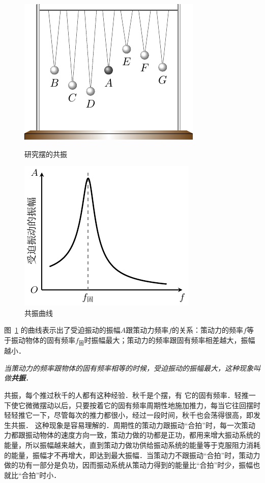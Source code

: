 \begin{figure}[htbp]
    \centering
    \begin{minipage}[b]{0.45\textwidth}
        \centering
        \includegraphics{fig/A/9-13.pdf}
        \caption{研究摆的共振}\label{fig_A_9-13}
    \end{minipage}
    \hfil
    \begin{minipage}[b]{0.45\textwidth}
        \centering
        \includegraphics{fig/A/9-14.pdf}
        \caption{共振曲线}\label{fig_A_9-14}
    \end{minipage}
\end{figure}


图~\ref{fig_A_9-14} 的曲线表示出了受迫振动的振幅$A$跟策动力频率$f$的关系：策动力的频率$f$等于振动物体的固有频率$f_{\text{固}}$时振幅最大；策动力的频率跟固有频率相差越大，振幅越小．

\textit{当策动力的频率跟物体的固有频率相等的时候，受迫振动的振幅最大，这种现象叫做\textbf{共振}．}

共振，每个推过秋千的人都有这种经验．秋千是个摆，有
它的固有频率．轻推一下使它微微摆动以后，只要按着它的固有频率周期性地施加推力，每当它往回摆时轻轻推它一下，尽管每次的推力都很小，经过一段时间，秋千也会荡得很高，即发生共振．
这种现象是容易理解的．周期性的策动力跟振动“合拍”时，每一次策动力都跟振动物体的速度方向一致，策动力做的功都是正功，都用来增大振动系统的能量，所以振幅越来越大，直到策动力做功供给振动系统的能量等于克服阻力消耗的能量，振幅才不再增大，即达到最大振幅．当策动力不跟振动“合拍”时，策动力做的功有一部分是负功，因而振动系统从策动力得到的能量比“合拍”时少，振幅也就比“合拍”时小．

